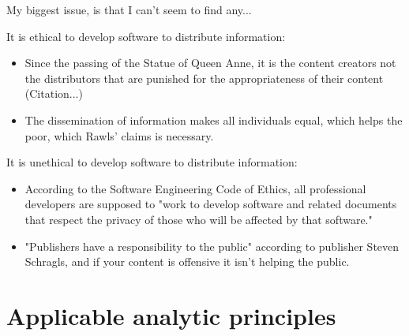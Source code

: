 \documentclass[11pt]{article}
\begin{document}
My biggest issue, is that I can't seem to find any...

It is ethical to develop software to distribute information:
\begin{itemize}
\item Since the passing of the Statue of Queen Anne, it is the content creators not the distributors that are punished for the appropriateness of their content (Citation...)
\item The dissemination of information makes all individuals equal, which helps the poor, which Rawls' claims is necessary. \cite{rawls}
\end{itemize}

It is unethical to develop software to distribute information:
\begin{itemize}
\item According to the Software Engineering Code of Ethics, all professional developers are supposed to "work to develop software and related documents that respect the privacy of those who will be affected by that software." \cite{secode}
\item "Publishers have a responsibility to the public" according to publisher Steven Schragls, and if your content is offensive it isn't helping the public. \cite[46]{hawker}
\end{itemize}

\section{Applicable analytic principles}
\end{document}
